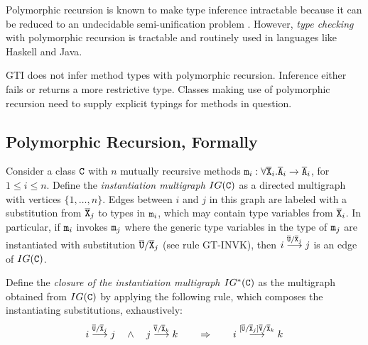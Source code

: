Polymorphic recursion is known to make type inference intractable
\cite{DBLP:journals/toplas/Henglein93,DBLP:journals/toplas/KfouryTU93}
because it can be reduced to an undecidable semi-unification problem
\cite{DBLP:journals/iandc/KfouryTU93}. However, \emph{type checking} with
polymorphic recursion is tractable and routinely used in languages like Haskell
and Java.

GTI does not infer method types with polymorphic recursion. Inference either fails or
returns a more restrictive type. Classes making use of polymorphic recursion need to supply
explicit typings for methods in question. 


\subsection{Polymorphic Recursion, Formally}
\label{sec:polym-recurs-form}

Consider a class ${\tt C}$ with $n$ mutually recursive methods ${\tt m}_i :
\forall\overline{\tt X}_i. \overline{\tt A}_i \to \overline{\tt A}_i$, for $1\le i\le n$. Define the \emph{instantiation
  multigraph $IG({\tt C})$} as a directed multigraph with vertices $\{1,
\dots, n\}$.
Edges between $i$ and $j$ in this graph are labeled with a
substitution from $\overline{\tt X}_j$ to types in ${\tt m}_i$, which may contain
type variables from $\overline{\tt X}_i$.
In particular, if ${\tt m}_i$ invokes ${\tt m}_j$ where the generic type variables in
the type of ${\tt m}_j$ are instantiated with substitution
$\overline{\tt U}/\overline{\tt X}_j$ (see rule GT-INVK), then 
$
i \stackrel{\overline{\tt U}/\overline{\tt X}_j}{\longrightarrow} j
$
is an edge of $IG ({\tt C})$.

Define the \emph{closure of the instantiation multigraph $IG^*({\tt C})$} as the multigraph
obtained from $IG({\tt C})$ by applying the following rule, which
composes the instantiating substitutions, exhaustively:
\begin{gather}\label{eq:1}
  i \stackrel{\overline{\tt U}/\overline{\tt X}_j}{\longrightarrow} j
  \quad\wedge\quad
  j \stackrel{\overline{\tt V}/\overline{\tt X}_k}{\longrightarrow} k
  \qquad\Rightarrow\qquad
  i \stackrel{[\overline{\tt U}/\overline{\tt X}_j]\overline{\tt V}/\overline{\tt X}_k}{\longrightarrow} k
\end{gather}

